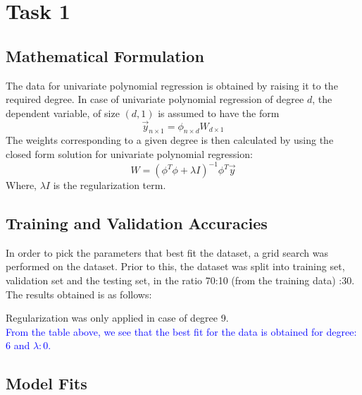 \documentclass[12pt,a4paper]{article}
\newcommand{\noi}{\noindent}
\begin{document}
\section{Task 1}
\subsection{Mathematical Formulation}
The data for univariate polynomial regression is obtained by raising it to the required degree. In case of univariate polynomial regression of degree $d$, the dependent variable, of size $(d,1)$ is assumed to have the form
\begin{equation}
    \vec{y}_{n\times1} = \mathit{\phi}_{n\times d}W_{d\times1}
\end{equation}
\noi
The weights corresponding to a given degree is then calculated by using the closed form solution for univariate polynomial regression:
\begin{equation}
    W = (\mathit{\phi}^T\mathit{\phi} + \lambda \mathit{I})^{-1}\mathit{\phi}^T\vec{y}
\end{equation}
Where, $\lambda\mathit{I}$ is the regularization term.

\subsection{Training and Validation Accuracies}
In order to pick the parameters that best fit the dataset, a grid search was performed on the dataset. Prior to this, the dataset was split into training set, validation set and the testing set, in the ratio 70:10 (from the training data) :30. The results obtained is as follows:


\vspace{-2em}\noi
Regularization was only applied in case of degree 9.\\


\noi
\textcolor{blue}{From the table above, we see that the best fit for the data is obtained for degree: $6$ and $\lambda:0$.}

\subsection{Model Fits}
\end{document}
